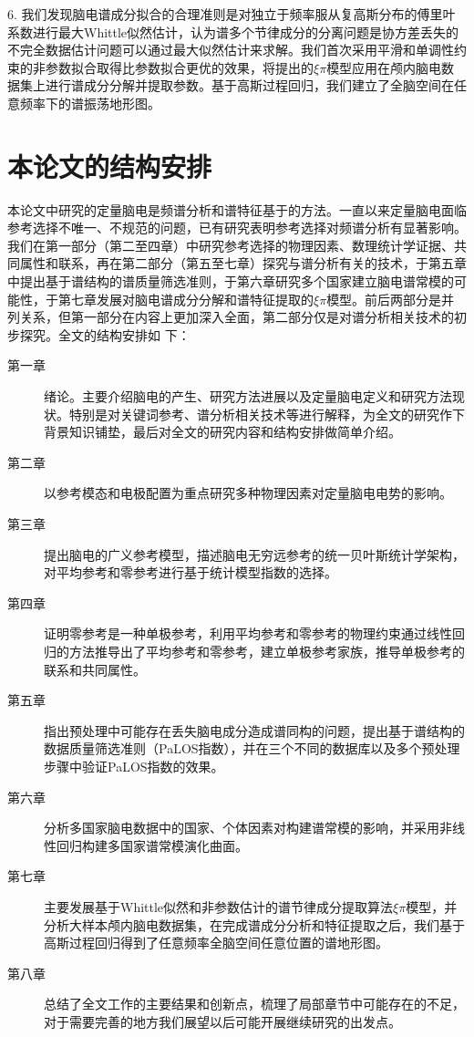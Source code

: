 6. 我们发现脑电谱成分拟合的合理准则是对独立于频率服从复高斯分布的傅里叶系数进行最大Whittle似然估计，认为谱多个节律成分的分离问题是协方差丢失的不完全数据估计问题可以通过最大似然估计来求解。我们首次采用平滑和单调性约束的非参数拟合取得比参数拟合更优的效果，将提出的$\xi\pi$模型应用在颅内脑电数据集上进行谱成分分解并提取参数。基于高斯过程回归，我们建立了全脑空间在任意频率下的谱振荡地形图。

\section{本论文的结构安排}
本论文中研究的定量脑电是频谱分析和谱特征基于的方法。一直以来定量脑电面临参考选择不唯一、不规范的问题，已有研究表明参考选择对频谱分析有显著影响。我们在第一部分（第二至四章）中研究参考选择的物理因素、数理统计学证据、共同属性和联系，再在第二部分（第五至七章）探究与谱分析有关的技术，于第五章中提出基于谱结构的谱质量筛选准则，于第六章研究多个国家建立脑电谱常模的可能性，于第七章发展对脑电谱成分分解和谱特征提取的$\xi\pi$模型。前后两部分是并列关系，但第一部分在内容上更加深入全面，第二部分仅是对谱分析相关技术的初步探究。全文的结构安排如
下：
\begin{description}
	\item[第一章] 绪论。主要介绍脑电的产生、研究方法进展以及定量脑电定义和研究方法现状。特别是对关键词参考、谱分析相关技术等进行解释，为全文的研究作下背景知识铺垫，最后对全文的研究内容和结构安排做简单介绍。
	\item[第二章] 以参考模态和电极配置为重点研究多种物理因素对定量脑电电势的影响。
	\item[第三章] 提出脑电的广义参考模型，描述脑电无穷远参考的统一贝叶斯统计学架构，对平均参考和零参考进行基于统计模型指数的选择。
	\item[第四章] 证明零参考是一种单极参考，利用平均参考和零参考的物理约束通过线性回归的方法推导出了平均参考和零参考，建立单极参考家族，推导单极参考的联系和共同属性。
	\item[第五章] 指出预处理中可能存在丢失脑电成分造成谱同构的问题，提出基于谱结构的数据质量筛选准则（PaLOS指数），并在三个不同的数据库以及多个预处理步骤中验证PaLOS指数的效果。
    \item[第六章] 分析多国家脑电数据中的国家、个体因素对构建谱常模的影响，并采用非线性回归构建多国家谱常模演化曲面。
	\item[第七章] 主要发展基于Whittle似然和非参数估计的谱节律成分提取算法$\xi\pi$模型，并分析大样本颅内脑电数据集，在完成谱成分分析和特征提取之后，我们基于高斯过程回归得到了任意频率全脑空间任意位置的谱地形图。
	\item[第八章] 总结了全文工作的主要结果和创新点，梳理了局部章节中可能存在的不足，对于需要完善的地方我们展望以后可能开展继续研究的出发点。
\end{description}